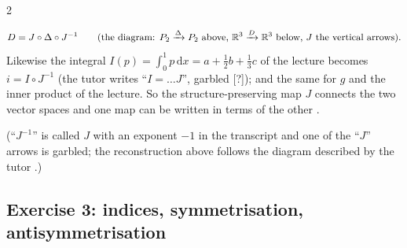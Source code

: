 \begin{paracol}{2}
\begin{enumerate}
        \[
          D=J\circ\Delta\circ J^{-1}\qquad\text{(the diagram: $P_2\xrightarrow{\Delta}P_2$ above, $\mathbb{R}^3\xrightarrow{D}\mathbb{R}^3$ below, $J$ the vertical arrows).}
        \]
        Likewise the integral $I(p)=\int_0^1p\,\mathrm dx=a+\tfrac12b+\tfrac13c$ of the lecture becomes $i=I\circ J^{-1}$ (the tutor writes ``$I=\dots J$'', garbled [?]); and the same for $g$ and the inner product of the lecture. So the structure-preserving map $J$ connects the two vector spaces and one map can be written in terms of the other
        .
\end{enumerate}
(``$J^{-1}$'' is called $J$ with an exponent $-1$ in the transcript and one of the ``$J$'' arrows is garbled; the reconstruction above follows the diagram described by the tutor .)

\subsection*{Exercise 3: indices, symmetrisation, antisymmetrisation}


\end{paracol}
